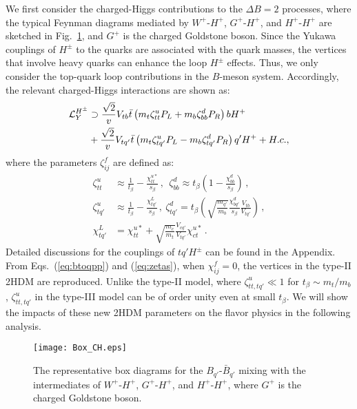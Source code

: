 \documentclass[prd,preprint,superscriptaddress,amsmath,amssymb]{revtex4}
\begin{document}
We first consider the charged-Higgs contributions to the $\Delta B=2$ processes, where the typical Feynman diagrams mediated by $W^+$-$H^+$, $G^+$-$H^+$, and $H^+$-$H^+$ are sketched in Fig.~\ref{fig:boxes}, and $G^+$ is the charged Goldstone boson. Since  the  Yukawa couplings of $H^\pm$ to the quarks are associated with the quark masses, the vertices that involve heavy quarks can enhance the loop $H^\pm$ effects. Thus, we only consider the top-quark loop contributions in the $B$-meson system. Accordingly, the relevant charged-Higgs interactions  are shown as:
%
 \begin{align}
 {\cal L}^{H^\pm}_Y & \supset \frac{\sqrt{2}}{v} V_{tb} \bar t \left( m_t \zeta^u_{tt} P_L + m_b \zeta^d_{bb} P_R \right) b  H^+  \nonumber \\
 & + \frac{\sqrt{2}}{v} V_{tq'} \bar t  \left( m_t \zeta^u_{tq'} P_L  -  m_b \zeta^d_{tq'} P_R\right) q'  H^+ +H.c.,  \label{eq:btoqpp}
 \end{align}
where  the parameters $\zeta^{f}_{ij}$ are defined as:
\begin{align}
\zeta^u_{tt} & \approx  \frac{1}{t_\beta} -\frac{\chi^{u*}_{tt} }{s_\beta}   \,, \  \ \zeta^d_{bb}  \approx  t_\beta \left( 1- \frac{\chi^d_{bb}}{ s_\beta} \right) \,, \nonumber \\
%
\zeta^u_{tq'} & \approx  \frac{1}{t_\beta} - \frac{\chi^L_{tq'} }{s_\beta}\,, \ \zeta^{d}_{tq'} = t_\beta\left( \sqrt{\frac{m_{q'}}{m_b}} \frac{\chi^d_{bq'}}{s_\beta} \frac{V_{tb}}{V_{tq'}}\right) \,, \nonumber \\
%
\chi^L_{tq'} & =\chi^{u*}_{tt} + \sqrt{\frac{m_c}{m_t}} \frac{V_{cq'}}{V_{tq'}} \chi^{u*}_{ct}\,.
  \label{eq:zetas}
%
\end{align}
Detailed discussions for  the couplings of $tq'H^\pm$ can be found in the Appendix. 
From Eqs.~(\ref{eq:btoqpp}) and (\ref{eq:zetas}),  when $\chi^f_{ij}=0$,  the vertices in the type-II 2HDM are reproduced. Unlike the type-II model, where $\zeta^u_{tt, tq'}\ll 1$ for $t_\beta \sim m_t/m_b$,  $\zeta^u_{tt, tq'}$  in the type-III model can be of order unity even at small $t_\beta$.  We will show the impacts of  these new 2HDM parameters  on the flavor physics in the following analysis. 

\begin{figure}[phtb]
\texttt{[image: Box\_CH.eps]}
\caption{The representative box diagrams for the $ B_{q'}$-$\bar{B}_{q'}$ mixing with the intermediates of $W^{+}$-$H^{+}$, $G^+$-$H^+$, and $H^{+}$-$H^+ $, where $G^+$ is the charged Goldstone boson.}
\label{fig:boxes}
\end{figure} 
\end{document}
